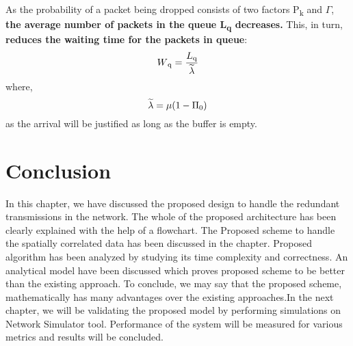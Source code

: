 As the probability of a packet being dropped consists of two factors P\textsubscript{k} and $\Gamma$, {\bf the average number of packets in the queue L\textsubscript{q} decreases.}
\newline
This, in turn, {\bf reduces the waiting time for the packets in queue}:
\begin{equation}
    W\textsubscript{q} = \frac{L\textsubscript{q}}{\widetilde{\lambda}}
\end{equation}
\newline where, 
\begin{equation}
    \widetilde{\lambda} = \mu (1-\Pi \textsubscript{0})
\end{equation}
as the arrival  will be justified as long as the buffer is empty.
\section{Conclusion}
In this chapter, we have discussed the proposed design to handle the redundant transmissions in the network. The whole of the proposed architecture has been clearly explained with the help of a flowchart. The Proposed scheme to handle the spatially correlated data has been discussed in the chapter. Proposed algorithm has been analyzed by studying its time complexity and correctness. An analytical model have been discussed which proves proposed scheme to be better than the existing approach. 
To conclude, we may say that the proposed scheme, mathematically has many advantages over the existing approaches.In the next chapter, we will be validating the proposed model by performing simulations on Network Simulator tool.  Performance of the system will  be measured for various metrics and results will be concluded.
